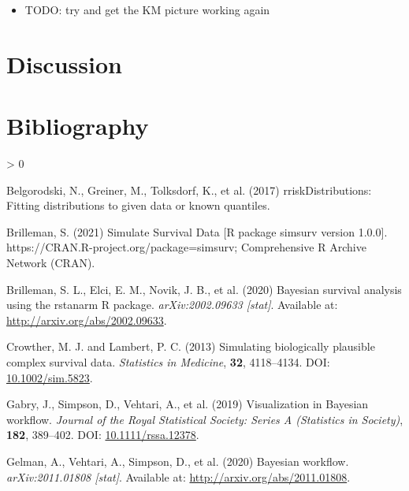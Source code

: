\documentclass[
  10pt,
  a4paper,
]{article}
\providecommand{\tightlist}{%
  \setlength{\itemsep}{0pt}\setlength{\parskip}{0pt}}
\newlength{\cslhangindent}
\newenvironment{CSLReferences}[2] %
 {%
  \setlength{\parindent}{0pt}
  \ifodd #1 \everypar{\setlength{\hangindent}{\cslhangindent}}\ignorespaces\fi
  \ifnum #2 > 0
  \setlength{\parskip}{#2\baselineskip}
  \fi
 }%
 {}
\begin{document}
\begin{itemize}
\tightlist
\item
  TODO: try and get the KM picture working again
\end{itemize}

\hypertarget{discussion}{%
\section{Discussion}\label{discussion}}

\hypertarget{bibliography}{%
\section{Bibliography}\label{bibliography}}

\hypertarget{refs}{}
\begin{CSLReferences}{1}{0}
\leavevmode\hypertarget{ref-belgorodski_rriskdistributions_2017}{}%
Belgorodski, N., Greiner, M., Tolksdorf, K., et al. (2017)
{rriskDistributions}: {Fitting} distributions to given data or known
quantiles.

\leavevmode\hypertarget{ref-brilleman_simulate_2021}{}%
Brilleman, S. (2021) Simulate {Survival Data} {[}{R} package simsurv
version 1.0.0{]}. https://CRAN.R-project.org/package=simsurv;
{Comprehensive R Archive Network (CRAN)}.

\leavevmode\hypertarget{ref-brilleman_bayesian_2020}{}%
Brilleman, S. L., Elci, E. M., Novik, J. B., et al. (2020) Bayesian
survival analysis using the rstanarm {R} package. \emph{arXiv:2002.09633
{[}stat{]}}. Available at: \url{http://arxiv.org/abs/2002.09633}.

\leavevmode\hypertarget{ref-crowther_simulating_2013}{}%
Crowther, M. J. and Lambert, P. C. (2013) Simulating biologically
plausible complex survival data. \emph{Statistics in Medicine},
\textbf{32}, 4118--4134. DOI:
\href{https://doi.org/10.1002/sim.5823}{10.1002/sim.5823}.

\leavevmode\hypertarget{ref-gabry_visualization_2019}{}%
Gabry, J., Simpson, D., Vehtari, A., et al. (2019) Visualization in
{Bayesian} workflow. \emph{Journal of the Royal Statistical Society:
Series A (Statistics in Society)}, \textbf{182}, 389--402. DOI:
\href{https://doi.org/10.1111/rssa.12378}{10.1111/rssa.12378}.

\leavevmode\hypertarget{ref-gelman_bayesian_2020}{}%
Gelman, A., Vehtari, A., Simpson, D., et al. (2020) Bayesian workflow.
\emph{arXiv:2011.01808 {[}stat{]}}. Available at:
\url{http://arxiv.org/abs/2011.01808}.


\end{CSLReferences}
\end{document}

